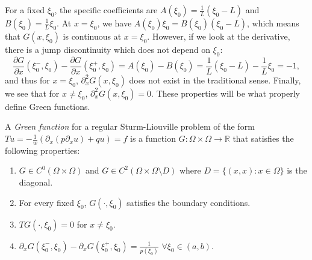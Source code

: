 For a fixed $\xi_0$, the specific coefficients are $A(\xi_0)=\frac{1}{L}(\xi_{0}-L)$ and $B(\xi_0)=\frac{1}{L}\xi_{0}$. At $x=\xi_0$, we have $A(\xi_{0})\xi_{0} = B(\xi_{0})(\xi_{0}-L)$, which means that $G(x, \xi_0)$ is continuous at $x=\xi_0$. However, if we look at the derivative, there is a jump discontinuity which does not depend on $\xi_0$:
\begin{equation*}
    \frac{\partial G}{\partial x}(\xi_{0}^{-},\xi_{0})-\frac{\partial G}{\partial x}(\xi_{0}^{+},\xi_{0})=A(\xi_{0})-B(\xi_{0}) = \frac{1}{L}(\xi_{0}-L)-\frac{1}{L}\xi_{0}=-1,
\end{equation*}
and thus for $x = \xi_0$, $\partial_x^2 G(x, \xi_0)$ does not exist in the traditional sense. Finally, we see that for $x \neq \xi_0$, $\partial_x^2 G(x, \xi_0) = 0$. These properties will be what properly define Green functions. 
\begin{definition}
A \textit{Green function} for a regular Sturm-Liouville problem of the form $Tu=-\frac{1}{w}(\partial_{x}(p\partial_{x}u)+qu)=f$ is a function $G:\Omega\times\Omega\to\mathbb{R}$ that satisfies the following properties: 
\begin{enumerate}
     \item $G\in C^{0}(\Omega\times\Omega)$ and $G\in C^{2}(\Omega\times\Omega \setminus D)$ where $D=\{(x,x):x\in\Omega\}$ is the diagonal. 
     \item For every fixed $\xi_0$, $G(\cdot, \xi_0)$ satisfies the boundary conditions. 
     \item $T G(\cdot, \xi_0) = 0$ for $x \neq \xi_0$.
     \item $\partial_{x}G(\xi_{0}^{-},\xi_{0})-\partial_{x}G(\xi_{0}^{+},\xi_{0})=\frac{1}{p(\xi_{0})}$ $\forall \xi_0\in(a,b)$.
\end{enumerate}
\end{definition}

